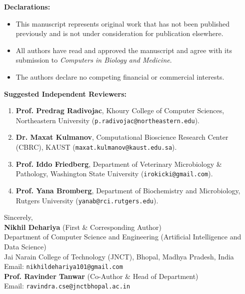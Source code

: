 \documentclass[11pt]{article}
\begin{document}
\vspace{0.5em}
\noindent\textbf{Declarations:}
\begin{itemize}
    \item This manuscript represents original work that has not been published previously and is not under consideration for publication elsewhere.
    \item All authors have read and approved the manuscript and agree with its submission to \textit{Computers in Biology and Medicine}.
    \item The authors declare no competing financial or commercial interests.
\end{itemize}

\vspace{0.5em}
\noindent\textbf{Suggested Independent Reviewers:}
\begin{enumerate}
    \item \textbf{Prof. Predrag Radivojac}, Khoury College of Computer Sciences, Northeastern University (\texttt{p.radivojac@northeastern.edu}).
    \item \textbf{Dr. Maxat Kulmanov}, Computational Bioscience Research Center (CBRC), KAUST (\texttt{maxat.kulmanov@kaust.edu.sa}).
    \item \textbf{Prof. Iddo Friedberg}, Department of Veterinary Microbiology \& Pathology, Washington State University (\texttt{irokicki@gmail.com}).
    \item \textbf{Prof. Yana Bromberg}, Department of Biochemistry and Microbiology, Rutgers University (\texttt{yanab@rci.rutgers.edu}).
\end{enumerate}

\vspace{1em}
\noindent Sincerely,\\[0.5em]
\textbf{Nikhil Dehariya} (First \& Corresponding Author)\\
Department of Computer Science and Engineering (Artificial Intelligence and Data Science)\\
Jai Narain College of Technology (JNCT), Bhopal, Madhya Pradesh, India\\
Email: \texttt{nikhildehariya101@gmail.com}\\[1em]
\textbf{Prof. Ravinder Tanwar} (Co-Author \& Head of Department)\\
Email: \texttt{ravindra.cse@jnctbhopal.ac.in}
\end{document}
